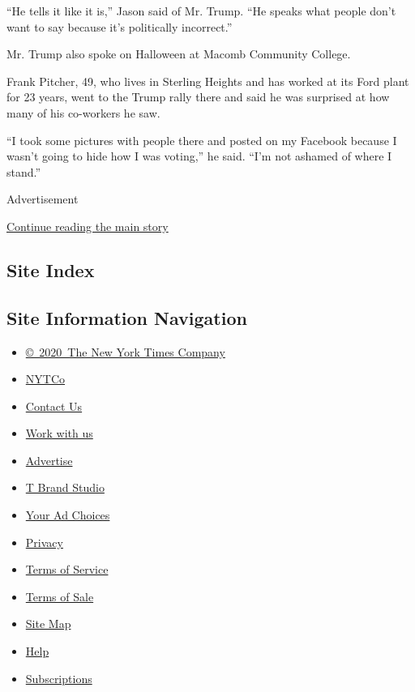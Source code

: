 ``He tells it like it is,'' Jason said of Mr. Trump. ``He speaks what
people don't want to say because it's politically incorrect.''

Mr. Trump also spoke on Halloween at Macomb Community College.

Frank Pitcher, 49, who lives in Sterling Heights and has worked at its
Ford plant for 23 years, went to the Trump rally there and said he was
surprised at how many of his co-workers he saw.

``I took some pictures with people there and posted on my Facebook
because I wasn't going to hide how I was voting,'' he said. ``I'm not
ashamed of where I stand.''

Advertisement

\protect\hyperlink{after-bottom}{Continue reading the main story}

\hypertarget{site-index}{%
\subsection{Site Index}\label{site-index}}

\hypertarget{site-information-navigation}{%
\subsection{Site Information
Navigation}\label{site-information-navigation}}

\begin{itemize}
\tightlist
\item
  \href{https://help.nytimes3xbfgragh.onion/hc/en-us/articles/115014792127-Copyright-notice}{©~2020~The
  New York Times Company}
\end{itemize}

\begin{itemize}
\tightlist
\item
  \href{https://www.nytco.com/}{NYTCo}
\item
  \href{https://help.nytimes3xbfgragh.onion/hc/en-us/articles/115015385887-Contact-Us}{Contact
  Us}
\item
  \href{https://www.nytco.com/careers/}{Work with us}
\item
  \href{https://nytmediakit.com/}{Advertise}
\item
  \href{http://www.tbrandstudio.com/}{T Brand Studio}
\item
  \href{https://www.nytimes3xbfgragh.onion/privacy/cookie-policy\#how-do-i-manage-trackers}{Your
  Ad Choices}
\item
  \href{https://www.nytimes3xbfgragh.onion/privacy}{Privacy}
\item
  \href{https://help.nytimes3xbfgragh.onion/hc/en-us/articles/115014893428-Terms-of-service}{Terms
  of Service}
\item
  \href{https://help.nytimes3xbfgragh.onion/hc/en-us/articles/115014893968-Terms-of-sale}{Terms
  of Sale}
\item
  \href{https://spiderbites.nytimes3xbfgragh.onion}{Site Map}
\item
  \href{https://help.nytimes3xbfgragh.onion/hc/en-us}{Help}
\item
  \href{https://www.nytimes3xbfgragh.onion/subscription?campaignId=37WXW}{Subscriptions}
\end{itemize}
